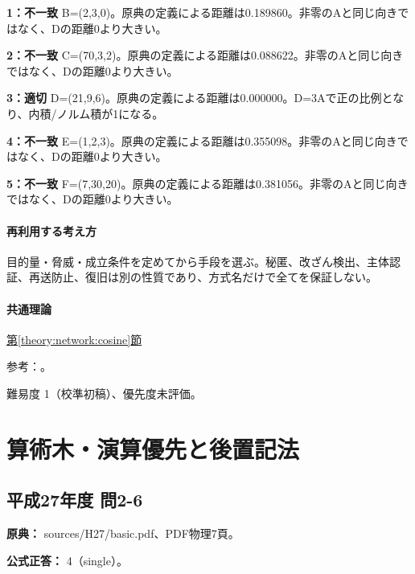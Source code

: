 \noindent\textbf{1：不一致} B=\allowbreak{}(2,3,0)。原典の定義による距離は0.189860。非零のAと同じ向きではなく、Dの距離0より大きい。\par

\noindent\textbf{2：不一致} C=\allowbreak{}(70,3,2)。原典の定義による距離は0.088622。非零のAと同じ向きではなく、Dの距離0より大きい。\par

\noindent\textbf{3：適切} D=\allowbreak{}(21,9,6)。原典の定義による距離は0.000000。D=\allowbreak{}3Aで正の比例となり、内積/ノルム積が1になる。\par

\noindent\textbf{4：不一致} E=\allowbreak{}(1,2,3)。原典の定義による距離は0.355098。非零のAと同じ向きではなく、Dの距離0より大きい。\par

\noindent\textbf{5：不一致} F=\allowbreak{}(7,30,20)。原典の定義による距離は0.381056。非零のAと同じ向きではなく、Dの距離0より大きい。\par

\paragraph{再利用する考え方} 目的量・脅威・成立条件を定めてから手段を選ぶ。秘匿、改ざん検出、主体認証、再送防止、復旧は別の性質であり、方式名だけで全てを保証しない。

\paragraph{共通理論} \hyperref[theory:network:cosine]{第\ref*{theory:network:cosine}節}

\par 参考：\cite{net_cosine}。

\par 難易度 1（校準初稿）、優先度未評価。

\section{算術木・演算優先と後置記法}

\subsection{平成27年度 問2-6}
\label{q:h27-reg-basic-2-6}

\noindent\textbf{原典：} sources/H27/basic.pdf、PDF物理7頁。

\textbf{公式正答：} 4（single）。

